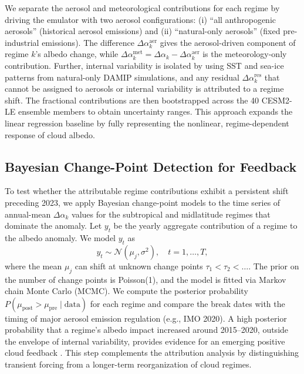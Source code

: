 \documentclass{article}
\begin{document}
We separate the aerosol and meteorological contributions for each regime by driving the emulator with two aerosol configurations: (i) ``all anthropogenic aerosols'' (historical aerosol emissions) and (ii) ``natural-only aerosols'' (fixed pre-industrial emissions). The difference $\Delta\alpha_k^{\text{aer}}$ gives the aerosol-driven component of regime $k$'s albedo change, while $\Delta\alpha_k^{\text{met}} = \Delta\alpha_k - \Delta\alpha_k^{\text{aer}}$ is the meteorology-only contribution. Further, internal variability is isolated by using SST and sea-ice patterns from natural-only DAMIP simulations, and any residual $\Delta\alpha_k^{\text{res}}$ that cannot be assigned to aerosols or internal variability is attributed to a regime shift. The fractional contributions are then bootstrapped across the 40 CESM2-LE ensemble members to obtain uncertainty ranges. This approach expands the linear regression baseline \cite{yuan2024albedo} by fully representing the nonlinear, regime-dependent response of cloud albedo.

\subsection{Bayesian Change-Point Detection for Feedback}
To test whether the attributable regime contributions exhibit a persistent shift preceding 2023, we apply Bayesian change-point models \cite{carlin1992bayes} to the time series of annual-mean $\Delta\alpha_k$ values for the subtropical and midlatitude regimes that dominate the anomaly. Let $y_t$ be the yearly aggregate contribution of a regime to the albedo anomaly. We model $y_t$ as
\begin{equation}
y_t \sim \mathcal{N}(\mu_{j}, \sigma^2),\quad t = 1,\dots,T,
\label{eq:changepoint}
\end{equation}
where the mean $\mu_j$ can shift at unknown change points $\tau_1 < \tau_2 < \dots$. The prior on the number of change points is Poisson(1), and the model is fitted via Markov chain Monte Carlo (MCMC). We compute the posterior probability $P(\mu_{\text{post}} > \mu_{\text{pre}} \mid \text{data})$ for each regime and compare the break dates with the timing of major aerosol emission regulation (e.g., IMO 2020). A high posterior probability that a regime’s albedo impact increased around 2015--2020, outside the envelope of internal variability, provides evidence for an emerging positive cloud feedback \cite{forster2021indicators}. This step complements the attribution analysis by distinguishing transient forcing from a longer-term reorganization of cloud regimes.
\end{document}
